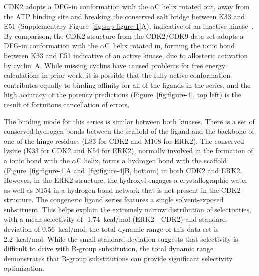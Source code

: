 \documentclass[phd,tocprelim]{cornell}
\begin{document}
CDK2 adopts a DFG-in conformation with the $\alpha$C helix rotated out, away from the ATP binding site and breaking the conserved salt bridge between K33 and E51 (Supplementary Figure~\ref{fig:sup-figure-1}A), indicative of an inactive kinase~\citep{Huse2002-ml,Hari:2013dp}. 
By comparison, the CDK2 structure from the CDK2/CDK9 data set adopts a DFG-in conformation with the $\alpha$C~helix rotated in, forming the ionic bond between K33 and E51 indicative of an active kinase, due to allosteric activation by cyclin~A. 
While missing cyclins have caused problems for free energy calculations in prior work, it is possible that the fully active conformation contributes equally to binding affinity for all of the ligands in the series, and the high accuracy of the potency predictions (Figure~\ref{fig:figure-4}, top left) is the result of fortuitous cancellation of errors. 

The binding mode for this series is similar between both kinases. 
There is a set of conserved hydrogen bonds between the scaffold of the ligand and the backbone of one of the hinge residues (L83 for CDK2 and M108 for ERK2). 
The conserved lysine (K33 for CDK2 and K54 for ERK2), normally involved in the formation of a ionic bond with the $\alpha$C helix, forms a hydrogen bond with the scaffold (Figure~\ref{fig:figure-4}A and~\ref{fig:figure-4}B, bottom) in both CDK2 and ERK2. 
However, in the ERK2 structure, the hydroxyl engages a crystallographic water as well as N154 in a hydrogen bond network that is not present in the CDK2 structure. 
The congeneric ligand series features a single solvent-exposed substituent. 
This helps explain the extremely narrow distribution of selectivities, with a mean selectivity of -1.74~kcal/mol (ERK2 - CDK2) and standard deviation of 0.56~kcal/mol; the total dynamic range of this data set is 2.2~kcal/mol. 
While the small standard deviation suggests that selectivity is difficult to drive with R-group substitution, the total dynamic range demonstrates that R-group substitutions can provide significant selectivity optimization. 
\end{document}
